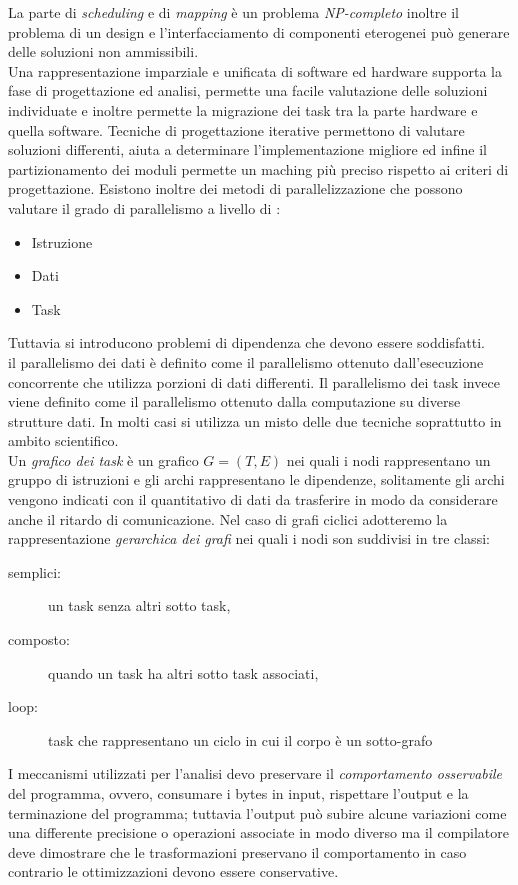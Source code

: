 La parte di \emph{scheduling} e di \emph{mapping} è un problema \emph{NP-completo} inoltre il problema di un design e l'interfacciamento di componenti eterogenei può generare delle soluzioni non ammissibili.\\
Una rappresentazione imparziale e unificata di software ed hardware supporta la fase di progettazione ed analisi, permette una facile valutazione delle soluzioni individuate e inoltre permette la migrazione dei task tra la parte hardware e quella software. Tecniche di progettazione iterative permettono di valutare soluzioni differenti, aiuta a determinare l'implementazione migliore ed infine il partizionamento dei moduli permette un maching più preciso rispetto ai criteri di progettazione. Esistono inoltre dei metodi di parallelizzazione che possono valutare il grado di parallelismo a livello di :
\begin{itemize}
\item Istruzione
\item Dati 
\item Task
\end{itemize}
Tuttavia si introducono problemi di dipendenza che devono essere soddisfatti.\\
il parallelismo dei dati è definito come il parallelismo ottenuto dall'esecuzione concorrente che utilizza porzioni di dati differenti.
Il parallelismo dei task invece viene definito come il parallelismo ottenuto dalla computazione su diverse strutture dati.
In molti casi si utilizza un misto delle due tecniche soprattutto in ambito scientifico.\\
Un \emph{grafico dei task} è un grafico $G=(T,E)$ nei quali i nodi rappresentano un gruppo di istruzioni e gli archi rappresentano le dipendenze, solitamente gli archi vengono indicati con il quantitativo di dati da trasferire in modo da considerare anche il ritardo di comunicazione.
Nel caso di grafi ciclici adotteremo la rappresentazione \emph{gerarchica dei grafi} nei quali i nodi son suddivisi in tre classi:
\begin{description}
\item[semplici:] un task senza altri sotto task,
\item[composto:] quando un task ha altri sotto task associati,
\item[loop:] task che rappresentano un ciclo in cui il corpo è un sotto-grafo
\end{description}
I meccanismi utilizzati per l'analisi devo preservare il \emph{comportamento osservabile} del programma, ovvero, consumare i bytes in input, rispettare l'output e la terminazione del programma; tuttavia l'output può subire alcune variazioni come una differente precisione o operazioni associate in modo diverso ma il compilatore deve dimostrare che le trasformazioni preservano il comportamento in caso contrario le ottimizzazioni devono essere conservative.\\
